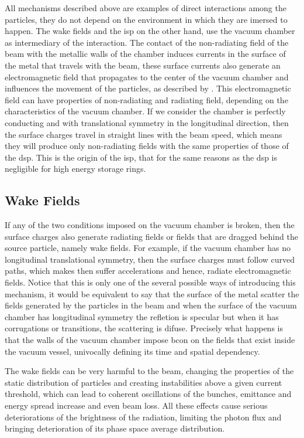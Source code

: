     All mechanisms described above are examples of direct interactions among the particles, they do not depend on the environment in which they are imersed to happen. The wake fields and the \gls{isp} on the other hand, use the vacuum chamber as intermediary of the interaction. The contact of the non-radiating field of the beam with the metallic walls of the chamber induces currents in the surface of the metal that travels with the beam, these surface currents also generate an electromagnetic field that propagates to the center of the vacuum chamber and influences the movement of the particles, as described by . This electromagnetic field can have properties of non-radiating and radiating field, depending on the characteristics of the vacuum chamber. If we consider the chamber is perfectly conducting and with translational symmetry in the longitudinal direction, then the surface charges travel in straight lines with the beam speed, which means they will produce only non-radiating fields with the same properties of those of the \gls{dsp}. This is the origin of the \gls{isp}, that for the same reasons as the \gls{dsp} is negligible for high energy storage rings.

\subsection{Wake Fields}\label{ssec:wake_fields}

    If any of the two conditions imposed on the vacuum chamber is broken, then the surface charges also generate radiating fields or fields that are dragged behind the source particle, namely wake fields. For example, if the vacuum chamber has no longitudinal translational symmetry, then the surface charges must follow curved paths, which makes then suffer accelerations and hence, radiate electromagnetic fields. Notice that this is only one of the several possible ways of introducing this mechanism, it would be equivalent to say that the surface of the metal scatter the fields generated by the particles in the beam and when the surface of the vacuum chamber has longitudinal symmetry the refletion is specular but when it has corrugations or transitions, the scattering is difuse. Precisely what happens is that the walls of the vacuum chamber impose \gls{bcon} on the fields that exist inside the vacuum vessel, univocally defining its time and spatial dependency.

    The wake fields can be very harmful to the beam, changing the properties of the static distribution of particles and creating instabilities above a given current threshold, which can lead to coherent oscillations of the bunches, emittance and energy spread increase and even beam loss. All these effects cause serious deteriorations of the brightness of the radiation, limiting the photon flux and bringing deterioration of its phase space average distribution.

